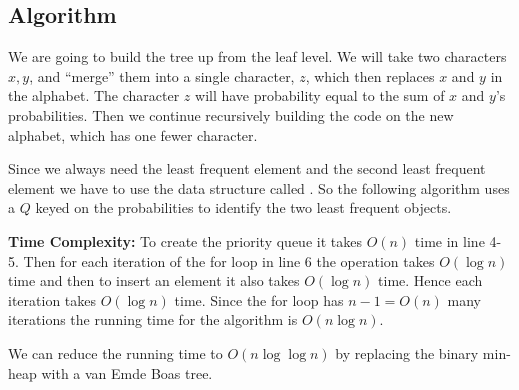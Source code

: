 \subsection{Algorithm}
\begin{idea}
	We are going to build the tree up from the leaf level. We will take two characters $x,y$, and ``merge” them into a single character, $z$, which then replaces $x$ and $y$ in the alphabet. The character $z$ will have  probability
	equal to the sum of $x$ and $y$’s probabilities. Then we continue recursively building the code on
	the new alphabet, which has one fewer character.
\end{idea}

Since we always need the least frequent element and the second least frequent element we have to use the data structure called . So the following algorithm uses a  $Q$ keyed on the probabilities to identify the two least frequent objects. 

\begin{algorithm}
	\DontPrintSemicolon
\caption{$(A,P)$}
\end{algorithm}

\parinf
\textbf{Time Complexity:} To create the priority queue it takes $O(n)$ time in line 4-5. Then for each iteration of the for loop in line 6 the  operation takes $O(\log n)$ time and then to insert an element it also takes $O(\log n)$ time. Hence each iteration takes $O(\log n)$ time. Since the for loop has $n-1=O(n)$ many iterations the running time for the algorithm is $O(n\log n)$. 

\begin{remark}
	We can reduce the running time to $O(n\log\log n)$ by replacing the binary min-heap with a van Emde Boas tree.
\end{remark}

